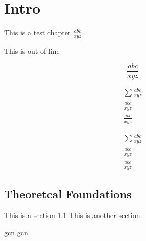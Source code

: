 \chapter{Intro}

This is a test chapter
$\frac{abc}{xyz}$



This is out of line

\[\frac{abc}{xyz}\]


\begin{align}
    \sum\frac{abc}{xyz}      \\
    \frac{abc}{xyz}\nonumber \\
    \frac{abc}{xyz}
\end{align}

\begin{align*}
    \sum\frac{abc}{xyz} \\
    \frac{abc}{xyz}     \\
    \frac{abc}{xyz}
\end{align*}


\section{Theoretcal Foundations}
\label{sec:Theoretical-Foundations} %
This is a section \cref{sec:Theoretical-Foundations} %
This is another section


\ac{gcn}
\Ac{gcn}



% 
